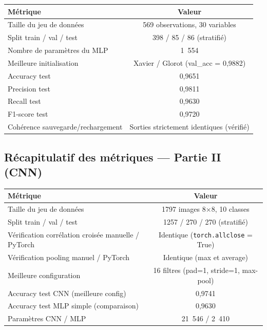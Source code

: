 \documentclass[11pt,a4paper]{article}
\begin{document}
\begin{table}[h]
\centering
\begin{tabular}{lc}
\toprule
\textbf{Métrique} & \textbf{Valeur} \\
\midrule
Taille du jeu de données               & 569 observations, 30 variables \\
Split train / val / test               & 398 / 85 / 86 (stratifié) \\
Nombre de paramètres du MLP            & 1~554 \\
Meilleure initialisation               & Xavier / Glorot (val\_acc = 0,9882) \\
Accuracy test                          & 0,9651 \\
Precision test                          & 0,9811 \\
Recall test                            & 0,9630 \\
F1-score test                           & 0,9720 \\
Cohérence sauvegarde/rechargement      & Sorties strictement identiques (vérifié) \\
\bottomrule
\end{tabular}
\end{table}

\subsection{Récapitulatif des métriques --- Partie II (CNN)}

\begin{table}[h]
\centering
\begin{tabular}{lc}
\toprule
\textbf{Métrique} & \textbf{Valeur} \\
\midrule
Taille du jeu de données                                 & 1797 images 8$\times$8, 10 classes \\
Split train / val / test                                 & 1257 / 270 / 270 (stratifié) \\
Vérification corrélation croisée manuelle / PyTorch       & Identique (\texttt{torch.allclose} = True) \\
Vérification pooling manuel / PyTorch                     & Identique (max et average) \\
Meilleure configuration                                   & 16 filtres (pad=1, stride=1, max-pool) \\
Accuracy test CNN (meilleure config)                      & 0,9741 \\
Accuracy test MLP simple (comparaison)                    & 0,9630 \\
Paramètres CNN / MLP                                      & 21~546 / 2~410 \\
\bottomrule
\end{tabular}
\end{table}
\end{document}
